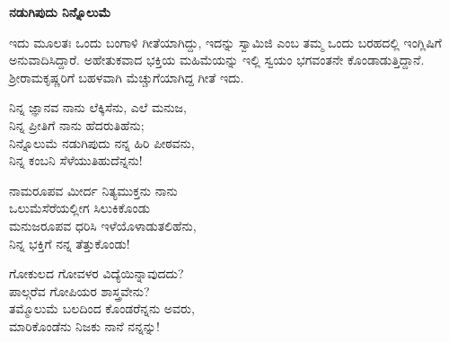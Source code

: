 \begin{myquote}
\end{myquote}

\begin{myquote}
\end{myquote}

\selectkan

\begin{center}
\textbf{ನಡುಗಿಪುದು ನಿನ್ನೊಲುಮೆ}
\end{center}

ಇದು ಮೂಲತಃ ಒಂದು ಬಂಗಾಳಿ ಗೀತೆಯಾಗಿದ್ದು, ಇದನ್ನು ಸ್ವಾಮಿಜಿ  ಎಂಬ ತಮ್ಮ ಒಂದು ಬರಹದಲ್ಲಿ ಇಂಗ್ಲಿಷಿಗೆ ಅನುವಾದಿಸಿದ್ದಾರೆ. ಅಹೇತುಕವಾದ ಭಕ್ತಿಯ ಮಹಿಮೆಯನ್ನು ಇಲ್ಲಿ ಸ್ವಯಂ ಭಗವಂತನೇ ಕೊಂಡಾಡುತ್ತಿದ್ದಾನೆ. ಶ‍್ರೀರಾಮಕೃಷ್ಣರಿಗೆ ಬಹಳವಾಗಿ ಮೆಚ್ಚುಗೆಯಾಗಿದ್ದ ಗೀತೆ ಇದು.

\begin{myquote}
ನಿನ್ನ ಜ್ಞಾನವ ನಾನು ಲೆಕ್ಕಿಸೆನು, ಎಲೆ ಮನುಜ,\\ನಿನ್ನ ಪ್ರೀತಿಗೆ ನಾನು ಹೆದರುತಿಹೆನು;\\ನಿನ್ನೊಲುಮೆ ನಡುಗಿಪುದು ನನ್ನ ಹಿರಿ ಪೀಠವನು,\\ನಿನ್ನ ಕಂಬನಿ ಸೆಳೆಯುತಿಹುದೆನ್ನನು!
\end{myquote}

\begin{myquote}
ನಾಮರೂಪವ ಮೀರ್ದ ನಿತ್ಯಮುಕ್ತನು ನಾನು\\ಒಲುಮೆಸೆರೆಯಲ್ಲೀಗ ಸಿಲುಕಿಕೊಂಡು\\ಮನುಜರೂಪವ ಧರಿಸಿ ಇಳೆಯೊಳಾಡುತಲಿಹೆನು,\\ನಿನ್ನ ಭಕ್ತಿಗೆ ನನ್ನ ತೆತ್ತುಕೊಂಡು!
\end{myquote}

\begin{myquote}
ಗೋಕುಲದ ಗೋವಳರ ವಿದ್ಯೆಯಿನ್ನಾವುದದು?\\ಪಾಲ್ಗರೆವ ಗೋಪಿಯರ ಶಾಸ್ತ್ರವೇನು?\\ತಮ್ಮೊಲುಮೆ ಬಲದಿಂದ ಕೊಂಡರೆನ್ನನು ಅವರು,\\ಮಾರಿಕೊಂಡೆನು ನಿಜಕು ನಾನೆ ನನ್ನನ್ನು!
\end{myquote}


